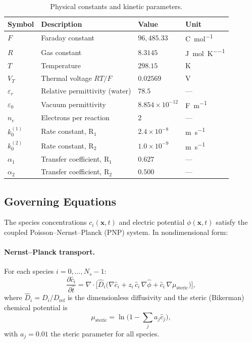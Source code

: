 \documentclass[11pt,a4paper]{article}
\newcommand{\vect}[1]{\boldsymbol{#1}}
\newcommand{\pder}[2]{\frac{\partial #1}{\partial #2}}
\newcommand{\kzero}{k_0}
\begin{document}
\begin{table}[H]
\centering
\caption{Physical constants and kinetic parameters.}
\label{tab:constants}
\begin{tabular}{llll}
\toprule
Symbol & Description & Value & Unit \\
\midrule
$F$ & Faraday constant & $96{,}485.33$ & \si{\coulomb\per\mol} \\
$R$ & Gas constant & $8.3145$ & \si{\joule\per\mol\per\kelvin} \\
$T$ & Temperature & $298.15$ & \si{\kelvin} \\
$V_T$ & Thermal voltage $RT/F$ & $0.02569$ & \si{\volt} \\
$\varepsilon_r$ & Relative permittivity (water) & $78.5$ & --- \\
$\varepsilon_0$ & Vacuum permittivity & $8.854\times10^{-12}$
  & \si{\farad\per\metre} \\
$n_e$ & Electrons per reaction & 2 & --- \\
\midrule
$\kzero^{(1)}$ & Rate constant, R$_1$ & $2.4\times10^{-8}$
  & \si{\metre\per\second} \\
$\kzero^{(2)}$ & Rate constant, R$_2$ & $1.0\times10^{-9}$
  & \si{\metre\per\second} \\
$\alpha_1$ & Transfer coefficient, R$_1$ & $0.627$ & --- \\
$\alpha_2$ & Transfer coefficient, R$_2$ & $0.500$ & --- \\
\bottomrule
\end{tabular}
\end{table}

\subsection{Governing Equations}\label{sec:governing}

The species concentrations $c_i(\vect{x},t)$ and electric potential
$\phi(\vect{x},t)$ satisfy the coupled Poisson--Nernst--Planck (PNP)
system. In nondimensional form:

\paragraph{Nernst--Planck transport.}
For each species $i = 0,\ldots, N_s-1$:
\begin{equation}\label{eq:NP}
  \pder{\hat{c}_i}{\hat{t}} = \nabla \cdot \bigl[
    \hat{D}_i\bigl( \nabla \hat{c}_i
    + z_i\, \hat{c}_i\, \nabla\hat{\phi}
    + \hat{c}_i\, \nabla \mu_{\mathrm{steric}} \bigr) \bigr],
\end{equation}
where $\hat{D}_i = D_i / D_{\mathrm{ref}}$ is the dimensionless
diffusivity and the steric (Bikerman) chemical potential is
\begin{equation}\label{eq:steric}
  \mu_{\mathrm{steric}} = \ln\!\bigl(1 - \textstyle\sum_j a_j \hat{c}_j\bigr),
\end{equation}
with $a_j = 0.01$ the steric parameter for all species.
\end{document}
